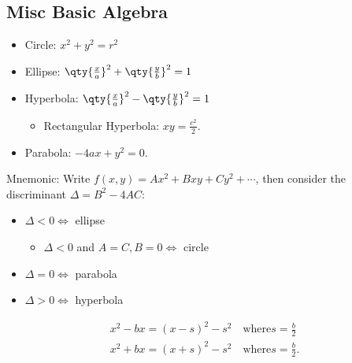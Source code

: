 \hypertarget{misc-basic-algebra}{%
\subsection{Misc Basic Algebra}\label{misc-basic-algebra}}

\begin{fact}

\envlist

\begin{itemize}
\tightlist
\item
  Circle: \(x^2 + y^2 = r^2\)
\item
  Ellipse: \(\qty{\frac x a}^2 + \qty{\frac y b}^2 = 1\)
\item
  Hyperbola: \(\qty{\frac x a}^2 - \qty{\frac y b}^2 = 1\)

  \begin{itemize}
  \tightlist
  \item
    Rectangular Hyperbola: \(xy = \frac{c^2}{2}\).
  \end{itemize}
\item
  Parabola: \(-4ax + y^2 = 0\).
\end{itemize}

Mnemonic: Write \(f(x, y) = Ax^2 + Bxy + Cy^2 + \cdots\), then consider
the discriminant \(\Delta = B^2 - 4AC\):

\begin{itemize}
\tightlist
\item
  \(\Delta < 0 \iff\) ellipse

  \begin{itemize}
  \tightlist
  \item
    \(\Delta < 0\) and \(A=C, B=0 \iff\) circle
  \end{itemize}
\item
  \(\Delta = 0 \iff\) parabola
\item
  \(\Delta > 0 \iff\) hyperbola
\end{itemize}

\end{fact}

\begin{fact}

\begin{align*}
x^2 - bx = (x - s)^2 - s^2 \quad\text{where} s = \frac{b}{2} \\
x^2 + bx = (x + s)^2 - s^2 \quad\text{where} s = \frac{b}{2}
.\end{align*}

\end{fact}

